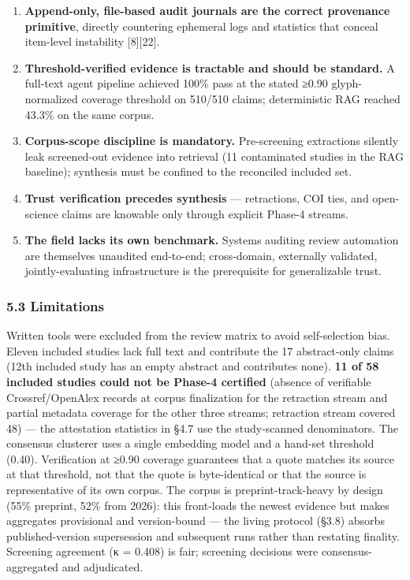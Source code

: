 \documentclass[11pt]{article}
\newcounter{none} %
\providecommand{\tightlist}{%
  \setlength{\itemsep}{0pt}\setlength{\parskip}{0pt}}
\begin{document}
\begin{enumerate}
\def\labelenumi{\arabic{enumi}.}
\tightlist
\item
  \textbf{Append-only, file-based audit journals are the correct
  provenance primitive}, directly countering ephemeral logs and
  statistics that conceal item-level instability {[}8{]}{[}22{]}.
\item
  \textbf{Threshold-verified evidence is tractable and should be
  standard.} A full-text agent pipeline achieved 100\% pass at the
  stated ≥0.90 glyph-normalized coverage threshold on 510/510 claims;
  deterministic RAG reached 43.3\% on the same corpus.
\item
  \textbf{Corpus-scope discipline is mandatory.} Pre-screening
  extractions silently leak screened-out evidence into retrieval (11
  contaminated studies in the RAG baseline); synthesis must be confined
  to the reconciled included set.
\item
  \textbf{Trust verification precedes synthesis} --- retractions, COI
  ties, and open-science claims are knowable only through explicit
  Phase-4 streams.
\item
  \textbf{The field lacks its own benchmark.} Systems auditing review
  automation are themselves unaudited end-to-end; cross-domain,
  externally validated, jointly-evaluating infrastructure is the
  prerequisite for generalizable trust.
\end{enumerate}

\subsubsection{5.3 Limitations}\label{limitations}

Written tools were excluded from the review matrix to avoid
self-selection bias. Eleven included studies lack full text and
contribute the 17 abstract-only claims (12th included study has an empty
abstract and contributes none). \textbf{11 of 58 included studies could
not be Phase-4 certified} (absence of verifiable Crossref/OpenAlex
records at corpus finalization for the retraction stream and partial
metadata coverage for the other three streams; retraction stream covered
48) --- the attestation statistics in §4.7 use the study-scanned
denominators. The consensus clusterer uses a single embedding model and
a hand-set threshold (0.40). Verification at ≥0.90 coverage guarantees
that a quote matches its source at that threshold, not that the quote is
byte-identical or that the source is representative of its own corpus.
The corpus is preprint-track-heavy by design (55\% preprint, 52\% from
2026): this front-loads the newest evidence but makes aggregates
provisional and version-bound --- the living protocol (§3.8) absorbs
published-version supersession and subsequent runs rather than restating
finality. Screening agreement (κ = 0.408) is fair; screening decisions
were consensus-aggregated and adjudicated.
\end{document}
